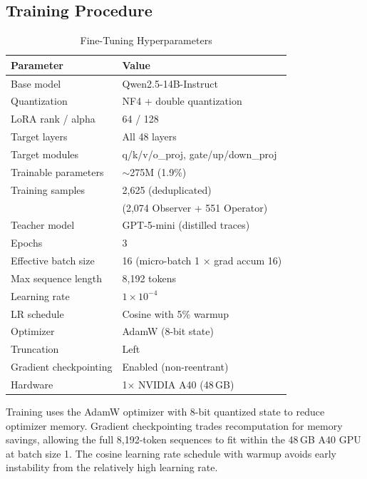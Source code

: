 \subsection{Training Procedure}

\begin{table}[H]
    \centering
    \caption{Fine-Tuning Hyperparameters}
    \label{tab:ft-hyperparams}
    \small
    \begin{tabular}{|l|l|}
        \hline
        \textbf{Parameter} & \textbf{Value} \\
        \hline
        Base model & Qwen2.5-14B-Instruct \\
        Quantization & NF4 + double quantization \\
        LoRA rank / alpha & 64 / 128 \\
        Target layers & All 48 layers \\
        Target modules & q/k/v/o\_proj, gate/up/down\_proj \\
        Trainable parameters & $\sim$275M (1.9\%) \\
        \hline
        Training samples & 2{,}625 (deduplicated) \\
        & (2{,}074 Observer + 551 Operator) \\
        Teacher model & GPT-5-mini (distilled traces) \\
        Epochs & 3 \\
        Effective batch size & 16 (micro-batch 1 $\times$ grad accum 16) \\
        Max sequence length & 8{,}192 tokens \\
        Learning rate & $1 \times 10^{-4}$ \\
        LR schedule & Cosine with 5\% warmup \\
        Optimizer & AdamW (8-bit state) \\
        Truncation & Left \\
        Gradient checkpointing & Enabled (non-reentrant) \\
        \hline
        Hardware & 1$\times$ NVIDIA A40 (48\,GB) \\
        \hline
    \end{tabular}
\end{table}

Training uses the AdamW optimizer with 8-bit quantized state to reduce optimizer memory. Gradient checkpointing trades recomputation for memory savings, allowing the full 8{,}192-token sequences to fit within the 48\,GB A40 GPU at batch size 1. The cosine learning rate schedule with warmup avoids early instability from the relatively high learning rate.

